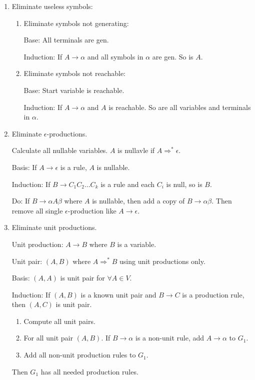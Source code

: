     \begin{enumerate}
        \item Eliminate useless symbols:
            \begin{enumerate}
                \item Eliminate symbols not generating:

                    Base: All terminals are gen.

                    Induction: If $A\rightarrow \alpha$ and all symbols in $\alpha$ are gen. So is $A$.
                \item Eliminate symbols not reachable:

                    Base: Start variable is reachable.

                    Induction: If $A\rightarrow \alpha$ and $A$ is reachable. So are all variables and terminals in $\alpha$.
            \end{enumerate}
        \item Eliminate $\epsilon$-productions. 

            Calculate all nullable variables. $A$ is nullavle if $A\Rightarrow ^{*}\epsilon$.

            Basis: If $A\rightarrow \epsilon$ is a rule, $A$ is nullable.

            Induction: If $B\rightarrow C_1C_2\ldots C_{k}$ is a rule and each $C_{i}$ is null, so is $B$.
            
            Do: If $B\rightarrow \alpha A\beta$ where $A$ is nullable, then add a copy of $B\rightarrow \alpha\beta$. Then remove all single $\epsilon$-production like $A\rightarrow \epsilon$.
        \item Eliminate unit productions.

            Unit production: $A\rightarrow B$ where $B$ is a variable.

            Unit pair: $\left( A,B \right) $ where $A\Rightarrow ^{*}B$ using unit productions only.

            Basis: $\left( A,A \right) $ is unit pair for $\forall A\in V$.

            Induction: If $\left( A,B \right) $ is a known unit pair and $B\rightarrow C$ is a production rule, then $\left( A,C \right) $ is unit pair.

            \begin{enumerate}
                \item Compute all unit pairs.
                \item For all unit pair $\left( A,B \right) $. If $B\rightarrow \alpha$ is a non-unit rule, add $A\rightarrow \alpha$ to $G_1$.
                \item Add all non-unit production rules to $G_1$.
            \end{enumerate}
            Then $G_1$ has all needed production rules.
    \end{enumerate}
